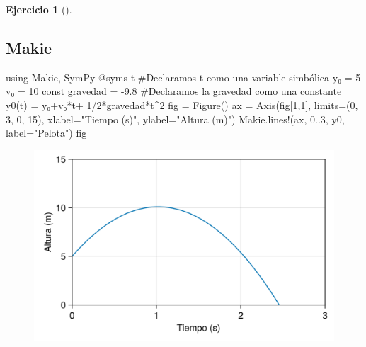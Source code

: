 \documentclass[
  a4paper,
]{scrreport}
\newenvironment{Shaded}{\begin{snugshade}}{\end{snugshade}}
\newcommand{\BuiltInTok}[1]{\textcolor[rgb]{0.00,0.23,0.31}{#1}}
\newcommand{\CommentTok}[1]{\textcolor[rgb]{0.37,0.37,0.37}{#1}}
\newcommand{\FloatTok}[1]{\textcolor[rgb]{0.68,0.00,0.00}{#1}}
\newcommand{\FunctionTok}[1]{\textcolor[rgb]{0.28,0.35,0.67}{#1}}
\newcommand{\ImportTok}[1]{\textcolor[rgb]{0.00,0.46,0.62}{#1}}
\newcommand{\KeywordTok}[1]{\textcolor[rgb]{0.00,0.23,0.31}{#1}}
\newcommand{\NormalTok}[1]{\textcolor[rgb]{0.00,0.23,0.31}{#1}}
\newcommand{\OperatorTok}[1]{\textcolor[rgb]{0.37,0.37,0.37}{#1}}
\newcommand{\PreprocessorTok}[1]{\textcolor[rgb]{0.68,0.00,0.00}{#1}}
\newcommand{\StringTok}[1]{\textcolor[rgb]{0.13,0.47,0.30}{#1}}
\theoremstyle{definition}
\newtheorem{exercise}{Ejercicio}[chapter]
\theoremstyle{remark}
\begin{document}
\begin{exercise}[]
\begin{tcolorbox}
\section{Makie}

\begin{Shaded}
\begin{Highlighting}[]
\ImportTok{using} \BuiltInTok{Makie}\NormalTok{, }\BuiltInTok{SymPy}
\PreprocessorTok{@syms}\NormalTok{ t  }\CommentTok{\#Declaramos t como una variable simbólica}
\NormalTok{y₀ }\OperatorTok{=} \FloatTok{5}
\NormalTok{v₀ }\OperatorTok{=} \FloatTok{10}
\KeywordTok{const}\NormalTok{ gravedad }\OperatorTok{=} \OperatorTok{{-}}\FloatTok{9.8}  \CommentTok{\#Declaramos la gravedad como una constante}
\FunctionTok{y0}\NormalTok{(t) }\OperatorTok{=}\NormalTok{ y₀}\OperatorTok{+}\NormalTok{v₀}\OperatorTok{*}\NormalTok{t}\OperatorTok{+} \FloatTok{1}\OperatorTok{/}\FloatTok{2}\OperatorTok{*}\NormalTok{gravedad}\OperatorTok{*}\NormalTok{t}\OperatorTok{\^{}}\FloatTok{2}
\NormalTok{fig }\OperatorTok{=} \FunctionTok{Figure}\NormalTok{()}
\NormalTok{ax }\OperatorTok{=} \FunctionTok{Axis}\NormalTok{(fig[}\FloatTok{1}\NormalTok{,}\FloatTok{1}\NormalTok{], limits}\OperatorTok{=}\NormalTok{(}\FloatTok{0}\NormalTok{, }\FloatTok{3}\NormalTok{, }\FloatTok{0}\NormalTok{, }\FloatTok{15}\NormalTok{), xlabel}\OperatorTok{=}\StringTok{"Tiempo (s)"}\NormalTok{, ylabel}\OperatorTok{=}\StringTok{"Altura (m)"}\NormalTok{)}
\NormalTok{Makie.}\FunctionTok{lines!}\NormalTok{(ax, }\FloatTok{0}\OperatorTok{..}\FloatTok{3}\NormalTok{, y0, label}\OperatorTok{=}\StringTok{"Pelota"}\NormalTok{)}
\NormalTok{fig}
\end{Highlighting}
\end{Shaded}

\begin{figure}[H]

{\centering \includegraphics{03-funciones-elementales_files/figure-pdf/cell-7-output-1.png}

}
\end{figure}
\end{tcolorbox}
\end{exercise}
\end{document}
